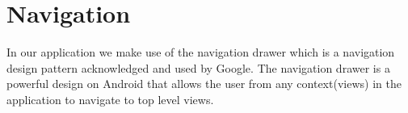\section{Navigation}\label{sec:navigation}
In our application we make use of the navigation drawer which is a navigation design pattern acknowledged and used by Google.\cite{guidelines-navigationdrawer}
The navigation drawer is a powerful design on Android that allows the user from any context(views) in the application to navigate to top level views.
